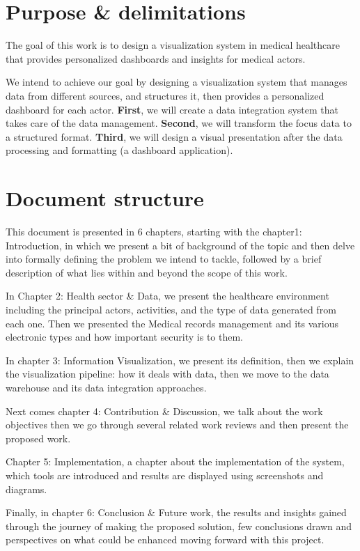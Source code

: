 \section{Purpose \& delimitations}

The goal of this work is to design a visualization system in medical healthcare that provides personalized dashboards and insights for medical actors.
 
We intend to achieve our goal by designing a visualization system that manages data from different sources, and structures it, then provides a personalized dashboard for each actor.
 \newline
 \textbf{First}, we will create a data integration system that takes care of the data management.\newline 
 \textbf{Second}, we will transform the focus data to a structured format.\newline
 \textbf{Third}, we will design a visual presentation after the data processing and formatting (a dashboard application).

 
\section{Document structure}
This document is presented in 6 chapters, starting with the chapter1: Introduction, in which we present a bit of background of the topic and then delve into formally defining the problem we intend to tackle, followed by a brief description of what lies within and beyond the scope of this work.
 
In Chapter 2: Health sector \& Data, we present the healthcare environment including the principal actors, activities, and the type of data generated from each one. Then we presented the Medical records management and its various electronic types and how important security is to them.
 
In chapter 3: Information Visualization, we present its definition, then we explain the visualization pipeline: how it deals with data, then we move to the data warehouse and its data integration approaches.
 
 Next comes chapter 4: Contribution \& Discussion, we talk about the work objectives then we go through several related work reviews and then present the proposed work. 
 
 Chapter 5: Implementation, a chapter about the implementation of the system, which tools are introduced and results are displayed using screenshots and diagrams.
 
Finally, in chapter 6: Conclusion \& Future work, the results and insights gained through the journey of making the proposed solution, few conclusions drawn and perspectives on what could be enhanced moving forward with this project.
